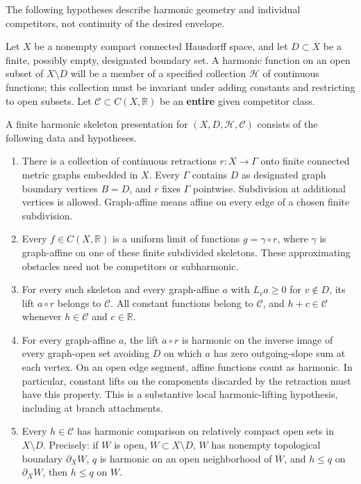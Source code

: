 \documentclass[
  11pt,
]{article}
\begin{document}
The following hypotheses describe harmonic geometry and individual
competitors, not continuity of the desired envelope.

Let \(X\) be a nonempty compact connected Hausdorff space, and let
\(D\subset X\) be a finite, possibly empty, designated boundary set. A
harmonic function on an open subset of \(X\setminus D\) will be a member
of a specified collection \(\mathcal H\) of continuous functions; this
collection must be invariant under adding constants and restricting to
open subsets. Let \(\mathcal C\subset C(X,\mathbb R)\) be an
\textbf{entire} given competitor class.

A finite harmonic skeleton presentation for
\((X,D,\mathcal H,\mathcal C)\) consists of the following data and
hypotheses.

\begin{enumerate}
\def\labelenumi{\arabic{enumi}.}
\item
  There is a collection of continuous retractions \(r:X\to\Gamma\) onto
  finite connected metric graphs embedded in \(X\). Every \(\Gamma\)
  contains \(D\) as designated graph boundary vertices \(B=D\), and
  \(r\) fixes \(\Gamma\) pointwise. Subdivision at additional vertices
  is allowed. Graph-affine means affine on every edge of a chosen finite
  subdivision.
\item
  Every \(f\in C(X,\mathbb R)\) is a uniform limit of functions
  \(g=\gamma\circ r\), where \(\gamma\) is graph-affine on one of these
  finite subdivided skeletons. These approximating obstacles need not be
  competitors or subharmonic.
\item
  For every such skeleton and every graph-affine \(a\) with
  \(L_va\geq0\) for \(v\notin D\), its lift \(a\circ r\) belongs to
  \(\mathcal C\). All constant functions belong to \(\mathcal C\), and
  \(h+c\in\mathcal C\) whenever \(h\in\mathcal C\) and
  \(c\in\mathbb R\).
\item
  For every graph-affine \(a\), the lift \(a\circ r\) is harmonic on the
  inverse image of every graph-open set avoiding \(D\) on which \(a\)
  has zero outgoing-slope sum at each vertex. On an open edge segment,
  affine functions count as harmonic. In particular, constant lifts on
  the components discarded by the retraction must have this property.
  This is a substantive local harmonic-lifting hypothesis, including at
  branch attachments.
\item
  Every \(h\in\mathcal C\) has harmonic comparison on relatively compact
  open sets in \(X\setminus D\). Precisely: if \(W\) is open,
  \(\overline W\subset X\setminus D\), \(W\) has nonempty topological
  boundary \(\partial_XW\), \(q\) is harmonic on an open neighborhood of
  \(\overline W\), and \(h\leq q\) on \(\partial_XW\), then \(h\leq q\)
  on \(W\).
\end{enumerate}
\end{document}

